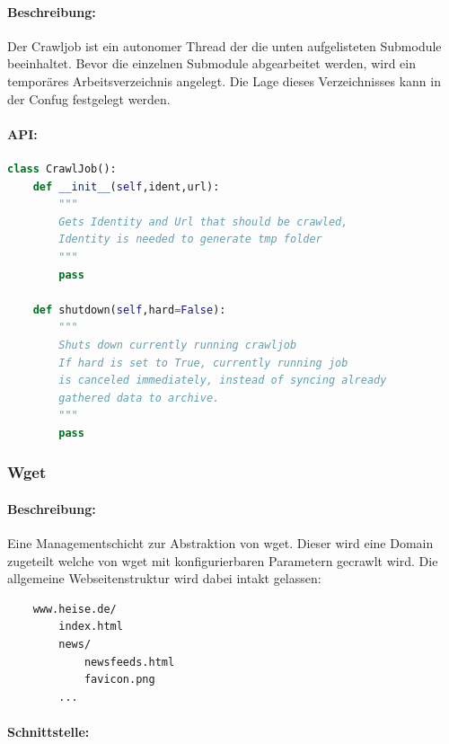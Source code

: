 
\paragraph{Beschreibung:}
\label{par:beschreibung_}
Der Crawljob ist ein autonomer Thread der die unten aufgelisteten Submodule beeinhaltet.
Bevor die einzelnen Submodule abgearbeitet werden, wird ein temporäres Arbeitsverzeichnis angelegt.
Die Lage dieses Verzeichnisses kann in der Confug festgelegt werden.
\paragraph{API:}
\label{par:api_}

\begin{lstlisting}[language=python]
class CrawlJob():
    def __init__(self,ident,url):
        """
        Gets Identity and Url that should be crawled,
        Identity is needed to generate tmp folder
        """
        pass

    def shutdown(self,hard=False): 
        """
        Shuts down currently running crawljob
        If hard is set to True, currently running job
        is canceled immediately, instead of syncing already
        gathered data to archive.
        """
        pass
\end{lstlisting}

\subsubsection{Wget}
\label{ssub:wget}
\paragraph{Beschreibung:}
\label{par:beschreibung_}
Eine Managementschicht zur Abstraktion von wget.
Dieser wird eine Domain zugeteilt welche von wget mit konfigurierbaren Parametern gecrawlt wird.
Die allgemeine Webseitenstruktur wird dabei intakt gelassen:

\begin{verbatim}
    www.heise.de/
        index.html
        news/
            newsfeeds.html
            favicon.png
        ...
\end{verbatim}

\paragraph{Schnittstelle:}
\label{par:schnittstelle_}

